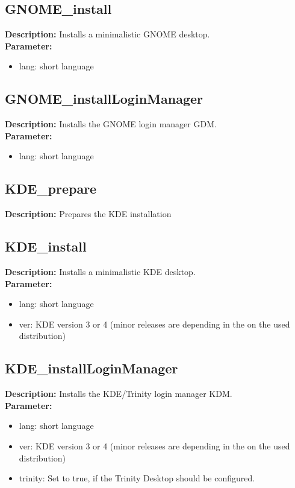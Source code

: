 \subsection{GNOME\_install}
\textbf{Description:} Installs a minimalistic GNOME desktop.\\
\textbf{Parameter:}
\begin{itemize}
\item lang: short language
\end{itemize}

\subsection{GNOME\_installLoginManager}
\textbf{Description:} Installs the GNOME login manager GDM.\\
\textbf{Parameter:}
\begin{itemize}
\item lang: short language
\end{itemize}

\subsection{KDE\_prepare}
\textbf{Description:} Prepares the KDE installation\\

\subsection{KDE\_install}
\textbf{Description:} Installs a minimalistic KDE desktop.\\
\textbf{Parameter:}
\begin{itemize}
\item lang: short language
\item ver: KDE version 3 or 4 (minor releases are depending in the on the used distribution)
\end{itemize}

\subsection{KDE\_installLoginManager}
\textbf{Description:} Installs the KDE/Trinity login manager KDM.\\
\textbf{Parameter:}
\begin{itemize}
\item lang: short language
\item ver: KDE version 3 or 4 (minor releases are depending in the on the used distribution)
\item trinity: Set to true, if the Trinity Desktop should be configured.
\end{itemize}

